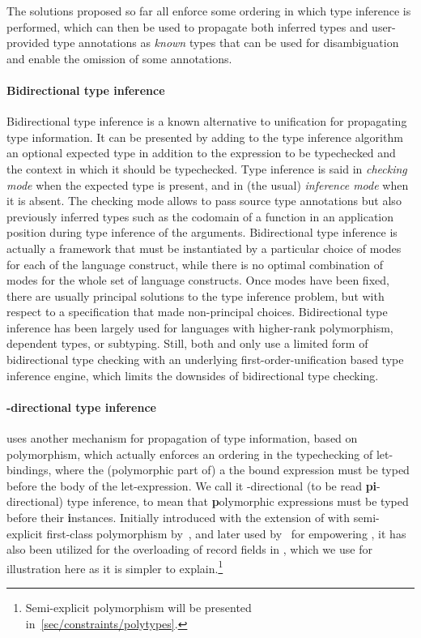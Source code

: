\documentclass[acmsmall,screen,nonacm]{acmart}
\begin{document}
The solutions proposed so far all enforce some ordering in which type
inference is performed, which can then be used to propagate both inferred
types and user-provided type annotations as \emph{known} types that can be
used for disambiguation and enable the omission of some annotations.

\paragraph{Bidirectional type inference}

Bidirectional type inference is a known alternative to unification for
propagating type information. It can be presented by adding to the type
inference algorithm an optional expected type in addition to the expression
to be typechecked and the context in which it should be typechecked.  Type
inference is said in \emph{checking mode} when the expected type is present,
and in (the usual) \emph{inference mode} when it is absent. The checking
mode allows to pass source type annotations but also previously inferred
types such as the codomain of a function in an application position during
type inference of the arguments.
%
Bidirectional type inference is actually a framework that must be
instantiated by a particular choice of modes for each of the language
construct, while there is no optimal combination of modes for the whole set
of language constructs. Once modes have been fixed, there are usually
principal solutions to the type inference problem, but with respect to a
specification that made non-principal choices.
%
Bidirectional type inference has been largely used for languages with
higher-rank polymorphism, dependent types, or subtyping.  Still, both \OCaml
and \Haskell only use a limited form of bidirectional type checking with an
underlying first-order-unification based type inference engine, which limits
the downsides of bidirectional type checking.


\paragraph{\Geninst-directional type inference}

\OCaml uses another mechanism for propagation of type information,
based on polymorphism, which actually enforces an ordering in the
typechecking of let-bindings, where the (polymorphic part of) a the bound
expression must be typed before the body of the let-expression.  We call it
\textbf{\geninst}-directional (to be read \textbf{pi}-directional) type
inference, to mean that \textbf{p}olymorphic expressions must be typed
before their \textbf{i}nstances.  Initially introduced with the extension of
\ML with semi-explicit first-class polymorphism by~\citet
{Garrigue-Remy/poly-ml}, and later used by~\citet
{LeBotlan-Remy/recasting-mlf} for empowering \MLF, it has also been utilized
for the overloading of record fields in \OCaml, which we use for
illustration here as it is simpler to explain.\footnote {Semi-explicit
polymorphism will be presented in~\cref{sec/constraints/polytypes}.}
\end{document}
